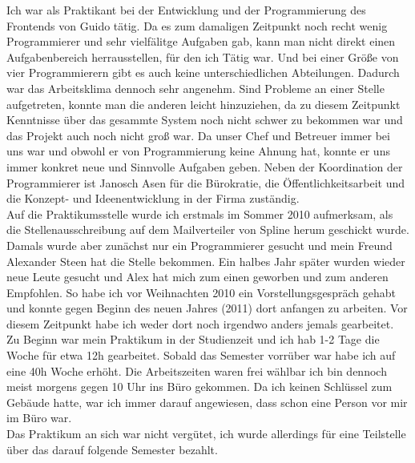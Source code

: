 Ich war als Praktikant bei der Entwicklung und der Programmierung des Frontends von Guido tätig. Da es zum damaligen Zeitpunkt noch recht wenig Programmierer und sehr vielfälitge Aufgaben gab, kann man nicht direkt einen Aufgabenbereich herrausstellen, für den ich Tätig war. Und bei einer Größe von vier Programmierern gibt es auch keine unterschiedlichen Abteilungen. Dadurch war das Arbeitsklima dennoch sehr angenehm. Sind Probleme an einer Stelle aufgetreten, konnte man die anderen leicht hinzuziehen, da zu diesem Zeitpunkt Kenntnisse über das gesammte System noch nicht schwer zu bekommen war und das Projekt auch noch nicht groß war. Da unser Chef und Betreuer immer bei uns war und obwohl er von Programmierung keine Ahnung hat, konnte er uns immer konkret neue und Sinnvolle Aufgaben geben. Neben der Koordination der Programmierer ist Janosch Asen für die Bürokratie, die Öffentlichkeitsarbeit und die Konzept- und Ideenentwicklung in der Firma zuständig.\\

Auf die Praktikumsstelle wurde ich erstmals im Sommer 2010 aufmerksam, als die Stellenausschreibung auf dem Mailverteiler von Spline herum geschickt wurde. Damals wurde aber zunächst nur ein Programmierer gesucht und mein Freund Alexander Steen  hat die Stelle bekommen. Ein halbes Jahr später wurden wieder neue Leute gesucht und Alex hat mich zum einen geworben und zum anderen Empfohlen. So habe ich vor Weihnachten 2010 ein Vorstellungsgespräch gehabt und konnte gegen Beginn des neuen Jahres (2011) dort anfangen zu arbeiten. Vor diesem Zeitpunkt habe ich weder dort noch irgendwo anders jemals gearbeitet.\\
Zu Beginn war mein Praktikum in der Studienzeit und ich hab 1-2 Tage die Woche für etwa 12h gearbeitet. Sobald das Semester vorrüber war habe ich auf eine 40h Woche erhöht. Die Arbeitszeiten waren frei wählbar ich bin dennoch meist morgens gegen 10 Uhr ins Büro gekommen. Da ich keinen Schlüssel zum Gebäude hatte, war ich immer darauf angewiesen, dass schon eine Person vor mir im Büro war.\\
Das Praktikum an sich war nicht vergütet, ich wurde allerdings für eine Teilstelle über das darauf folgende Semester bezahlt.\\

